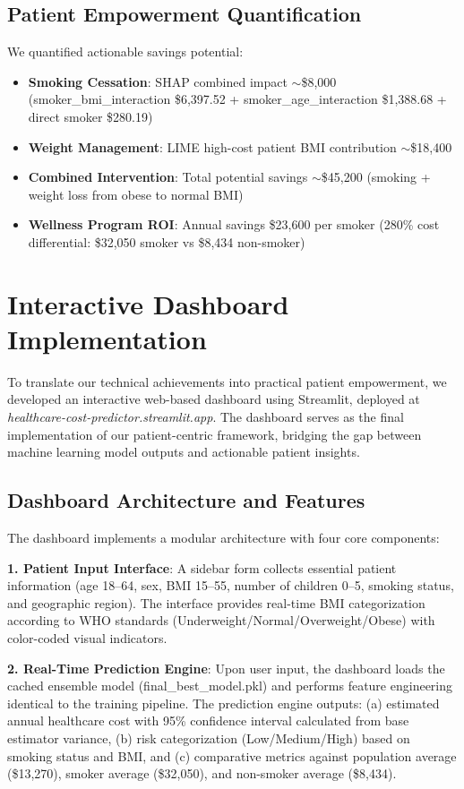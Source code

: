 \documentclass[conference]{IEEEtran}
\begin{document}
\subsection{Patient Empowerment Quantification}
We quantified actionable savings potential:
\begin{itemize}
\item \textbf{Smoking Cessation}: SHAP combined impact $\sim$\$8,000 (smoker\_bmi\_interaction \$6,397.52 + smoker\_age\_interaction \$1,388.68 + direct smoker \$280.19)
\item \textbf{Weight Management}: LIME high-cost patient BMI contribution $\sim$\$18,400
\item \textbf{Combined Intervention}: Total potential savings $\sim$\$45,200 (smoking + weight loss from obese to normal BMI)
\item \textbf{Wellness Program ROI}: Annual savings \$23,600 per smoker (280\% cost differential: \$32,050 smoker vs \$8,434 non-smoker)
\end{itemize}

\section{Interactive Dashboard Implementation}

To translate our technical achievements into practical patient empowerment, we developed an interactive web-based dashboard using Streamlit, deployed at \textit{healthcare-cost-predictor.streamlit.app}. The dashboard serves as the final implementation of our patient-centric framework, bridging the gap between machine learning model outputs and actionable patient insights.

\subsection{Dashboard Architecture and Features}

The dashboard implements a modular architecture with four core components:

\textbf{1. Patient Input Interface}: A sidebar form collects essential patient information (age 18--64, sex, BMI 15--55, number of children 0--5, smoking status, and geographic region). The interface provides real-time BMI categorization according to WHO standards (Underweight/Normal/Overweight/Obese) with color-coded visual indicators.

\textbf{2. Real-Time Prediction Engine}: Upon user input, the dashboard loads the cached ensemble model (final\_best\_model.pkl) and performs feature engineering identical to the training pipeline. The prediction engine outputs: (a) estimated annual healthcare cost with 95\% confidence interval calculated from base estimator variance, (b) risk categorization (Low/Medium/High) based on smoking status and BMI, and (c) comparative metrics against population average (\$13,270), smoker average (\$32,050), and non-smoker average (\$8,434).
\end{document}
